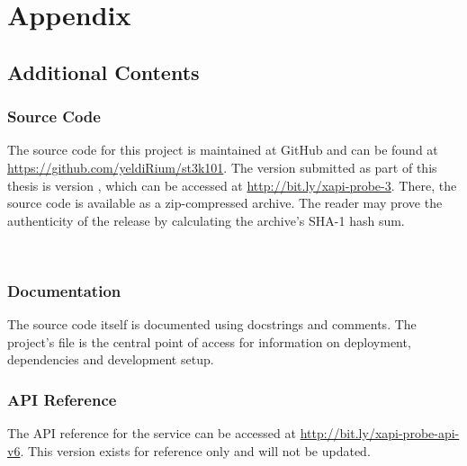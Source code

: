 \section{Appendix}

    \subsection{Additional Contents}
	\subsubsection{Source Code}
	    The source code for this project is maintained at GitHub and can be found at
	    \url{https://github.com/yeldiRium/st3k101}.
	    The version submitted as part of this thesis is version , 
	    which can be accessed at \url{http://bit.ly/xapi-probe-3}. There, the
	    source code is available as a zip-compressed archive. The reader may
	    prove the authenticity of the release by calculating the archive's
	    SHA-1 hash sum. \\
	     
	     
	    \\[1em]

	\subsubsection{Documentation}
	    The source code itself is documented using docstrings and comments.
	    The project's  file is the central point of access
	    for information on deployment, dependencies and development
	    setup.

	\subsubsection{API Reference}
	    The API reference for the  service can be accessed
	    at \url{http://bit.ly/xapi-probe-api-v6}. This version exists
	    for reference only and will not be updated.

	\pagebreak
	
    
    \pagebreak
    